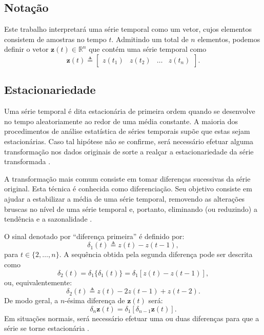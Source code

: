 \subsection{Notação}
Este trabalho interpretará uma série temporal como um vetor, cujos elementos consistem de amostras no tempo $t$. Admitindo um total de $n$ elementos, podemos definir o vetor $\boldsymbol{z}(t) \in \mathbb{R}^n$ que contém uma série temporal como
\begin{equation}
\boldsymbol{z}(t) \triangleq \begin{bmatrix}z(t_1) & z(t_2) & \ldots & z(t_n)\end{bmatrix}.
\end{equation}
 
 \subsection{Estacionariedade}
 
 Uma série temporal é dita estacionária de primeira ordem quando se desenvolve no tempo aleatoriamente ao redor de uma média constante. A maioria dos procedimentos de análise estatística de séries temporais supõe que estas sejam estacionárias. Caso tal hipótese não se confirme, será necessário efetuar alguma transformação nos dados originais de sorte a realçar a estacionariedade da série transformada \cite{grenander1957statistical}.

 A transformação mais comum consiste em tomar diferenças sucessivas da série original. Esta técnica é conhecida como diferenciação. Seu objetivo consiste em ajudar a estabilizar a média de uma série temporal, removendo as alterações bruscas no nível de uma série temporal e, portanto, eliminando (ou reduzindo) a tendência e a sazonalidade \cite{morettin2006analise, hyndman2018forecasting}.
 
O sinal denotado por ``diferença primeira'' é definido por:
\begin{equation} 
\delta_1(t) \triangleq z(t) - z(t - 1),
\end{equation}
para $t \in \{2,\ldots,n\}$. A sequência obtida pela segunda diferença pode ser descrita como
\begin{equation}
\delta_2(t) = \delta_1\{\delta_1(t)\} = \delta_1[z(t) - z(t - 1)],
\end{equation}
ou, equivalentemente:
\begin{equation}
\delta_2(t) \triangleq z(t) - 2z(t - 1) + z(t - 2).
\end{equation}
De modo geral, a $n$-ésima diferença de $\boldsymbol{z}(t)$ será:
\begin{equation}
\delta_n\boldsymbol{z}(t) = \delta_1[\delta_{n-1}\boldsymbol{z}(t)].
\end{equation}
Em situações normais, será necessário efetuar uma ou duas diferenças para que a série se torne estacionária \cite{morettin2006analise}.

